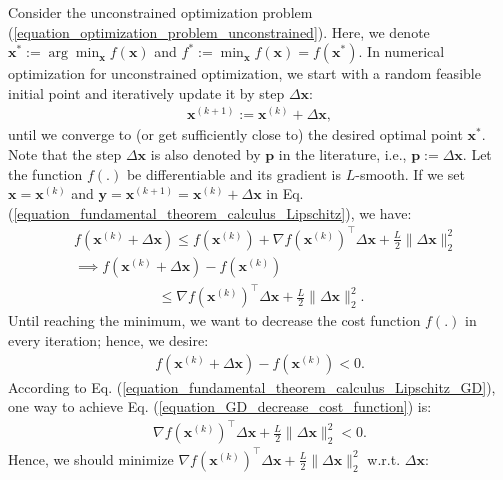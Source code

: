 \documentclass[lang=cn,10pt]{gorgeousnbook}
\numberwithin{equation}{section}%
\numberwithin{figure}{section}%
\begin{document}
Consider the unconstrained optimization problem (\ref{equation_optimization_problem_unconstrained}).
Here, we denote $\boldsymbol{x}^* := \arg \min_{\boldsymbol{x}} f(\boldsymbol{x})$ and $f^* := \min_{\boldsymbol{x}} f(\boldsymbol{x}) = f(\boldsymbol{x}^*)$.
In numerical optimization for unconstrained optimization, we start with a random feasible initial point and iteratively update it by step $\Delta \boldsymbol{x}$: 
\begin{align}\label{equation_update_point_numerical_optimization}
\boldsymbol{x}^{(k+1)} := \boldsymbol{x}^{(k)} + \Delta \boldsymbol{x},
\end{align}
until we converge to (or get sufficiently close to) the desired optimal point $\boldsymbol{x}^*$. 
Note that the step $\Delta\boldsymbol{x}$ is also denoted by $\boldsymbol{p}$ in the literature, i.e., $\boldsymbol{p} := \Delta\boldsymbol{x}$.
Let the function $f(.)$ be differentiable and its gradient is $L$-smooth. 
If we set $\boldsymbol{x} = \boldsymbol{x}^{(k)}$ and $\boldsymbol{y} = \boldsymbol{x}^{(k+1)} = \boldsymbol{x}^{(k)} + \Delta \boldsymbol{x}$ in Eq. (\ref{equation_fundamental_theorem_calculus_Lipschitz}), we have:
\begin{align}
&f(\boldsymbol{x}^{(k)} + \Delta \boldsymbol{x}) \leq f(\boldsymbol{x}^{(k)}) + \nabla f(\boldsymbol{x}^{(k)})^\top \Delta \boldsymbol{x} + \frac{L}{2} \|\Delta \boldsymbol{x}\|_2^2 \nonumber\\
&\implies f(\boldsymbol{x}^{(k)} + \Delta \boldsymbol{x}) - f(\boldsymbol{x}^{(k)}) \nonumber\\
&~~~~~~~~~~~~~~~~~~~~~~~~~~~\leq \nabla f(\boldsymbol{x}^{(k)})^\top \Delta \boldsymbol{x} + \frac{L}{2} \|\Delta \boldsymbol{x}\|_2^2. \label{equation_fundamental_theorem_calculus_Lipschitz_GD}
\end{align}
Until reaching the minimum, we want to decrease the cost function $f(.)$ in every iteration; hence, we desire:
\begin{align}\label{equation_GD_decrease_cost_function}
f(\boldsymbol{x}^{(k)} + \Delta \boldsymbol{x}) - f(\boldsymbol{x}^{(k)}) < 0.
\end{align}
According to Eq. (\ref{equation_fundamental_theorem_calculus_Lipschitz_GD}), one way to achieve Eq. (\ref{equation_GD_decrease_cost_function}) is:
\begin{align*}
\nabla f(\boldsymbol{x}^{(k)})^\top \Delta \boldsymbol{x} + \frac{L}{2} \|\Delta \boldsymbol{x}\|_2^2 < 0.
\end{align*}
Hence, we should minimize $\nabla f(\boldsymbol{x}^{(k)})^\top \Delta \boldsymbol{x} + \frac{L}{2} \|\Delta \boldsymbol{x}\|_2^2$ w.r.t. $\Delta \boldsymbol{x}$:
\end{document}
